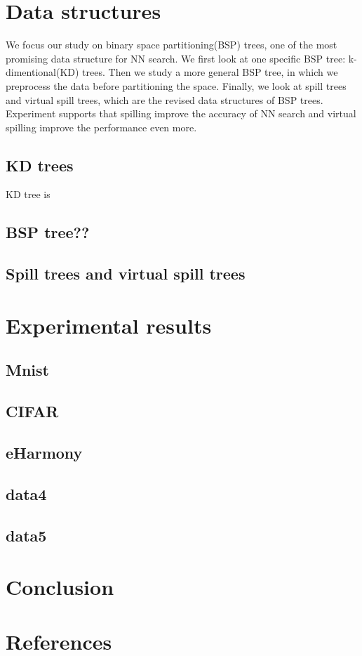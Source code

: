 \documentclass[paper=letter, fontsize=12pt]{article} %
\begin{document}
\section{Data structures}
We focus our study on binary space partitioning(BSP) trees, one of the most promising data structure for NN search. We first look at one specific BSP tree: k-dimentional(KD) trees. Then we study a more general BSP tree, in which we preprocess the data before partitioning the space. Finally, we look at spill trees and virtual spill trees, which are the revised data structures of BSP trees. Experiment supports that spilling improve the accuracy of NN search and virtual spilling improve the performance even more.

\subsection{KD trees}
KD tree is 
\subsection{BSP tree??}
\subsection{Spill trees and virtual spill trees}

\section{Experimental results}
\subsection{Mnist}
\subsection{CIFAR}
\subsection{eHarmony}
\subsection{data4}
\subsection{data5}

\section{Conclusion}

\section{References}
\end{document}
